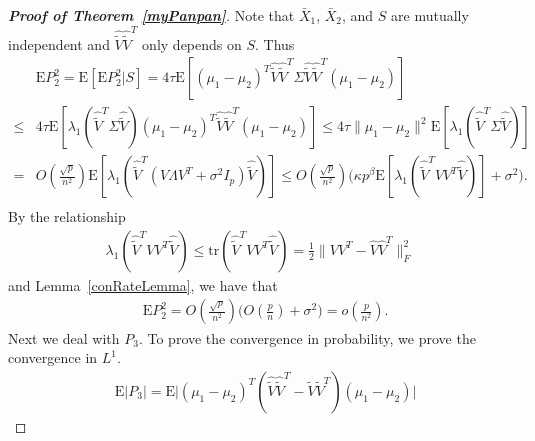 \documentclass[review]{elsarticle}
\theoremstyle{plain}
\theoremstyle{definition}
\theoremstyle{remark}
\begin{document}
\begin{proof}[\textbf{Proof of Theorem~\ref{myPanpan}}]
    Note that $\bar{X}_1$, $\bar{X}_2$, and $S$ are mutually independent and $\hat{\tilde{V}}\hat{\tilde{V}}^T$ only depends on $S$. Thus
    \begin{equation*}
        \begin{aligned}
            &\mathrm{E} P_2^2
            =
            \mathrm{E}[\mathrm{E} P_2^2|S]= 4\tau \mathrm{E}[{(\mu_1-\mu_2)}^T \hat{\tilde{V}}\hat{\tilde{V}}^T\Sigma \hat{\tilde{V}}\hat{\tilde{V}}^T(\mu_1-\mu_2)]\\
            \leq &
             4\tau\mathrm{E}[\lambda_1(\hat{\tilde{V}}^T\Sigma \hat{\tilde{V}}) {(\mu_1-\mu_2)}^T \hat{\tilde{V}}\hat{\tilde{V}}^T(\mu_1-\mu_2)]
            \leq 
             4\tau\|\mu_1-\mu_2\|^2
             \mathrm{E}[\lambda_1(\hat{\tilde{V}}^T\Sigma \hat{\tilde{V}}) ]\\
             =&
             O(\frac{\sqrt{p}}{n^2})
             \mathrm{E}[\lambda_1(\hat{\tilde{V}}^T (V\Lambda V^T +\sigma^2 I_p) \hat{\tilde{V}})]
             \leq 
             O(\frac{\sqrt{p}}{n^2})
             \big(\kappa p^{\beta}\mathrm{E}[\lambda_1(\hat{\tilde{V}}^T VV^T  \hat{\tilde{V}})]+\sigma^2\big).\\
        \end{aligned}
    \end{equation*}
    By the relationship
    \begin{equation*}
        \begin{aligned}
\lambda_1(\hat{\tilde{V}}^T VV^T  \hat{\tilde{V}})
            \leq
            \mathrm{tr}(\hat{\tilde{V}}^T VV^T  \hat{\tilde{V}})
            =
            \frac{1}{2}\|VV^T-\hat{V}\hat{V}^T\|^2_F
        \end{aligned}
    \end{equation*}
    and Lemma~\ref{conRateLemma}, we have that
    \begin{equation*}
        \begin{aligned}
            &\mathrm{E} P_2^2
             =
             O(\frac{\sqrt{p}}{n^2})
             \big(O(\frac{p}{n})+\sigma^2\big)
             =o(\frac{p}{n^2}).
        \end{aligned}
    \end{equation*}
    Next we deal with $P_3$. To prove the convergence in probability, we prove the convergence in $L^1$.
    \begin{equation*}
        \begin{aligned}
            &\mathrm{E}|P_3|=
            \mathrm{E}\big|{(\mu_1-\mu_2)}^T(\hat{\tilde{V}}\hat{\tilde{V}}^T-\tilde{V}\tilde{V}^T)(\mu_1-\mu_2)\big|

\end{aligned}
\end{equation*}
\end{proof}
\end{document}
